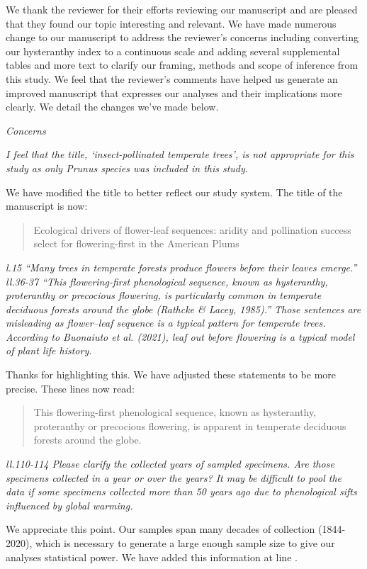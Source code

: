 \documentclass{article}[12pt]
\begin{document}
We thank the reviewer for their efforts reviewing our manuscript and are pleased that they found our topic interesting and relevant. We have made numerous change to our manuscript to address the reviewer's concerns including converting our hysteranthy index to a continuous scale and adding several supplemental tables and more text to clarify our framing, methods and scope of inference from this study. We feel that the reviewer's comments have helped us generate an improved manuscript that expresses our analyses and their implications more clearly. We detail the changes we've made below.

\emph{Concerns}

\emph{I feel that the title, ‘insect-pollinated temperate trees’, is not appropriate for this study as only Prunus species was included in this study.}

We have modified the title to better reflect our study system. The title of the manuscript is now: 
\begin{quote}Ecological drivers of flower-leaf sequences: aridity and pollination success select for flowering-first in the American Plums \end{quote}

\emph{l.15 “Many trees in temperate forests produce flowers before their leaves emerge.”
ll.36-37 “This flowering-first phenological sequence, known as hysteranthy, proteranthy or precocious flowering, is particularly common in temperate deciduous forests around the globe (Rathcke & Lacey, 1985).”
Those sentences are misleading as flower–leaf sequence is a typical pattern for temperate trees. According to Buonaiuto et al. (2021), leaf out before flowering is a typical model of plant life history.}

Thanks for highlighting this. We have adjusted these statements to be more precise. These lines now read:
\begin{quote} This flowering-first phenological sequence, known as hysteranthy, proteranthy or precocious flowering, is apparent in temperate deciduous forests around the globe. \end{quote}

\emph{ll.110-114 Please clarify the collected years of sampled specimens. Are those specimens collected in a year or over the years? It may be difficult to pool the data if some specimens collected more than 50 years ago due to phenological sifts influenced by global warming.}

We appreciate this point. Our samples span many decades of collection (1844-2020), which is necessary to generate a large enough sample size to give our analyses statistical power. We have added this information at line .
\end{document}
